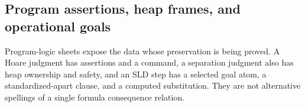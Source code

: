 
\subsection{Program assertions, heap frames, and operational goals}

Program-logic sheets expose the data whose preservation is being proved.
A Hoare judgment has assertions and a command, a separation judgment also
has heap ownership and safety, and an SLD step has a selected goal atom,
a standardized-apart clause, and a computed substitution.  They are not
alternative spellings of a single formula consequence relation.

